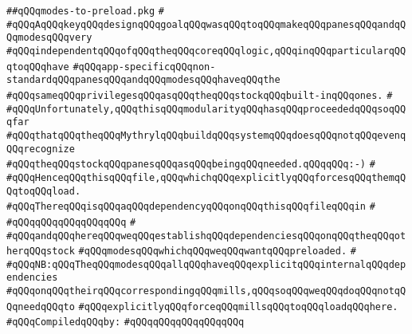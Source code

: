 \label{src/lib/x-kit/widget/edit/modes-to-preload.pkg}
\verb|##qQQqmodes-to-preload.pkg|\newline
\verb|#|\newline
\verb|#qQQqAqQQqkeyqQQqdesignqQQqgoalqQQqwasqQQqtoqQQqmakeqQQqpanesqQQqandqQQqmodesqQQqvery|\newline
\verb|#qQQqindependentqQQqofqQQqtheqQQqcoreqQQqlogic,qQQqinqQQqparticularqQQqtoqQQqhave|\newline
\verb|#qQQqapp-specificqQQqnon-standardqQQqpanesqQQqandqQQqmodesqQQqhaveqQQqthe|\newline
\verb|#qQQqsameqQQqprivilegesqQQqasqQQqtheqQQqstockqQQqbuilt-inqQQqones.|\newline
\verb|#|\newline
\verb|#qQQqUnfortunately,qQQqthisqQQqmodularityqQQqhasqQQqproceededqQQqsoqQQqfar|\newline
\verb|#qQQqthatqQQqtheqQQqMythrylqQQqbuildqQQqsystemqQQqdoesqQQqnotqQQqevenqQQqrecognize|\newline
\verb|#qQQqtheqQQqstockqQQqpanesqQQqasqQQqbeingqQQqneeded.qQQqqQQq:-)|\newline
\verb|#|\newline
\verb|#qQQqHenceqQQqthisqQQqfile,qQQqwhichqQQqexplicitlyqQQqforcesqQQqthemqQQqtoqQQqload.|\newline
\verb|#qQQqThereqQQqisqQQqaqQQqdependencyqQQqonqQQqthisqQQqfileqQQqin|\newline
\verb|#|\newline
\verb|#qQQqqQQqqQQqqQQqqQQq|\newline
\verb|#|\newline
\verb|#qQQqandqQQqhereqQQqweqQQqestablishqQQqdependenciesqQQqonqQQqtheqQQqotherqQQqstock|\newline
\verb|#qQQqmodesqQQqwhichqQQqweqQQqwantqQQqpreloaded.|\newline
\verb|#|\newline
\verb|#qQQqNB:qQQqTheqQQqmodesqQQqallqQQqhaveqQQqexplicitqQQqinternalqQQqdependencies|\newline
\verb|#qQQqonqQQqtheirqQQqcorrespondingqQQqmills,qQQqsoqQQqweqQQqdoqQQqnotqQQqneedqQQqto|\newline
\verb|#qQQqexplicitlyqQQqforceqQQqmillsqQQqtoqQQqloadqQQqhere.|\newline
\newline
\verb|#qQQqCompiledqQQqby:|\newline
\verb|#qQQqqQQqqQQqqQQqqQQq|\newline

